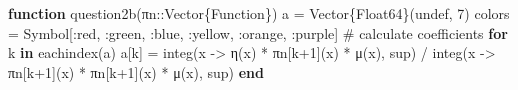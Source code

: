 \documentclass[
]{article}
\newenvironment{Shaded}{\begin{snugshade}}{\end{snugshade}}
\newcommand{\CommentTok}[1]{\textcolor[rgb]{0.37,0.37,0.37}{#1}}
\newcommand{\ConstantTok}[1]{\textcolor[rgb]{0.56,0.35,0.01}{#1}}
\newcommand{\ControlFlowTok}[1]{\textcolor[rgb]{0.00,0.23,0.31}{\textbf{#1}}}
\newcommand{\DataTypeTok}[1]{\textcolor[rgb]{0.68,0.00,0.00}{#1}}
\newcommand{\FloatTok}[1]{\textcolor[rgb]{0.68,0.00,0.00}{#1}}
\newcommand{\FunctionTok}[1]{\textcolor[rgb]{0.28,0.35,0.67}{#1}}
\newcommand{\KeywordTok}[1]{\textcolor[rgb]{0.00,0.23,0.31}{\textbf{#1}}}
\newcommand{\NormalTok}[1]{\textcolor[rgb]{0.00,0.23,0.31}{#1}}
\newcommand{\OperatorTok}[1]{\textcolor[rgb]{0.37,0.37,0.37}{#1}}
\begin{document}
\begin{Shaded}
\begin{Highlighting}[]
\KeywordTok{function} \FunctionTok{question2b}\NormalTok{(πn}\OperatorTok{::}\DataTypeTok{Vector\{Function\}}\NormalTok{)}
\NormalTok{    a }\OperatorTok{=} \FunctionTok{Vector}\DataTypeTok{\{Float64\}}\NormalTok{(}\ConstantTok{undef}\NormalTok{, }\FloatTok{7}\NormalTok{)}
\NormalTok{    colors }\OperatorTok{=} \DataTypeTok{Symbol}\NormalTok{[}\OperatorTok{:}\NormalTok{red, }\OperatorTok{:}\NormalTok{green, }\OperatorTok{:}\NormalTok{blue, }\OperatorTok{:}\NormalTok{yellow, }\OperatorTok{:}\NormalTok{orange, }\OperatorTok{:}\NormalTok{purple]}
    \CommentTok{\# calculate coefficients}
    \ControlFlowTok{for}\NormalTok{ k }\KeywordTok{in} \FunctionTok{eachindex}\NormalTok{(a)}
\NormalTok{        a[k] }\OperatorTok{=} \FunctionTok{integ}\NormalTok{(x }\OperatorTok{{-}\textgreater{}} \FunctionTok{η}\NormalTok{(x) }\OperatorTok{*}\NormalTok{ πn[k}\OperatorTok{+}\FloatTok{1}\NormalTok{](x) }\OperatorTok{*} \FunctionTok{μ}\NormalTok{(x), sup) }\OperatorTok{/} \FunctionTok{integ}\NormalTok{(x }\OperatorTok{{-}\textgreater{}}\NormalTok{ πn[k}\OperatorTok{+}\FloatTok{1}\NormalTok{](x) }\OperatorTok{*}\NormalTok{ πn[k}\OperatorTok{+}\FloatTok{1}\NormalTok{](x) }\OperatorTok{*} \FunctionTok{μ}\NormalTok{(x), sup)}
    \ControlFlowTok{end}
    

\end{Highlighting}
\end{Shaded}
\end{document}
